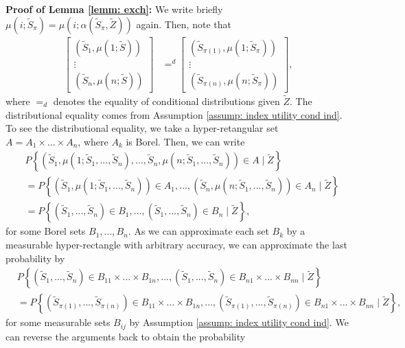 \documentclass[12pt, fullpage]{amsart}
\theoremstyle{definition}
\theoremstyle{definition}
\theoremstyle{definition}
\begin{document}
\begin{bibunit}[econometrica]
\noindent \textbf{Proof of Lemma \ref{lemm: exch}: } We write briefly $\mu(i;\tilde S_\pi) = \mu(i;\alpha(\tilde S_\pi, \tilde Z))$ again. Then, note that
\begin{align}
	\label{distr eq}
	\begin{bmatrix}
		(\tilde S_{1},\mu(1; \tilde S)) \\
		\vdots \\
		(\tilde S_{n},\mu(n; \tilde S))
	\end{bmatrix}
	&=^d \begin{bmatrix}
		(\tilde S_{\pi(1)},\mu(1;\tilde S_\pi)) \\
		\vdots \\
		(\tilde S_{\pi(n)},\mu(n;\tilde S_\pi))
	\end{bmatrix}
	,
\end{align}
where $=_d$ denotes the equality of conditional distributions given $\tilde Z$. The  distributional equality comes from Assumption \ref{assump: index utility cond ind}. To see the  distributional equality, we take a hyper-retangular set $A = A_1 \times ... \times A_n$, where $A_k$ is Borel. Then, we can write
\begin{align*}
	&P\left\{ (\tilde S_{1},\mu(1; \tilde S_1,...,\tilde S_n),...,\tilde S_{n},\mu(n; \tilde S_1,...,\tilde S_n)) \in A \mid \tilde Z \right\}\\
	&= P\left\{ (\tilde S_{1},\mu(1; \tilde S_1,...,\tilde S_n)) \in A_1,...,(\tilde S_{n},\mu(n; \tilde S_1,...,\tilde S_n)) \in A_n \mid \tilde Z \right\}\\
	&= P\left\{ (\tilde S_1,...,\tilde S_n) \in B_1,...,(\tilde S_1,...,\tilde S_n) \in B_n \mid \tilde Z \right\},
\end{align*}
for some Borel sets $B_1,...,B_n$. As we can approximate each set $B_k$ by a measurable hyper-rectangle with arbitrary accuracy, we can approximate the last probability by
\begin{align*}
	& P\left\{ (\tilde S_1,...,\tilde S_n) \in B_{11} \times... \times B_{1n},...,(\tilde S_1,...,\tilde S_n) \in B_{n1} \times... \times B_{nn} \mid \tilde Z \right\}\\
	&= P\left\{ (\tilde S_{\pi(1)},...,\tilde S_{\pi(n)}) \in B_{11} \times... \times B_{1n},...,(\tilde S_{\pi(1)},...,\tilde S_{\pi(n)}) \in B_{n1} \times... \times B_{nn} \mid \tilde Z \right\},
\end{align*}
for some measurable sets $B_{ij}$ by Assumption \ref{assump: index utility cond ind}. We can reverse the arguments back to obtain the probability 
\begin{align*}

\end{align*}
\end{bibunit}
\end{document}
